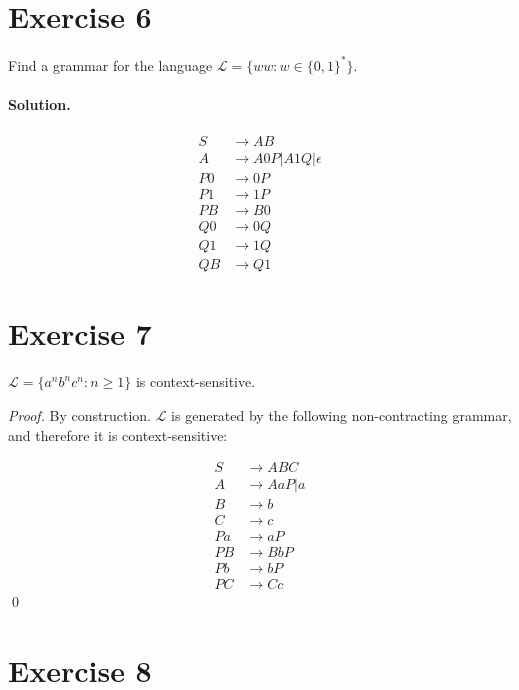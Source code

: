 \documentclass[11pt]{llncs}
\begin{document}
\section*{Exercise 6}

Find a grammar for the language $\mathcal{L} = \{ ww: w \in \{0, 1\}^* \}$.

\paragraph{Solution.}

\begin{align*}
  S  &\rightarrow AB\\
  A  &\rightarrow A0P | A1Q | \epsilon\\
  P0 &\rightarrow 0P\\
  P1 &\rightarrow 1P\\
  PB &\rightarrow B0\\
  Q0 &\rightarrow 0Q\\
  Q1 &\rightarrow 1Q\\
  QB &\rightarrow Q1
\end{align*}

\section*{Exercise 7}

\begin{lemma}
$\mathcal{L} = \{a^n b^n c^n: n \geq 1\}$ is context-sensitive.
\end{lemma}
\begin{proof}
By construction. $\mathcal{L}$ is generated by the following non-contracting
grammar, and therefore it is context-sensitive:

\begin{align*}
  S  &\rightarrow ABC\\
  A  &\rightarrow AaP | a\\
  B  &\rightarrow b\\
  C  &\rightarrow c\\
  Pa &\rightarrow aP\\
  PB &\rightarrow BbP\\
  Pb &\rightarrow bP\\
  PC &\rightarrow Cc
\end{align*}
\qed
\end{proof}

\section*{Exercise 8}
\end{document}
